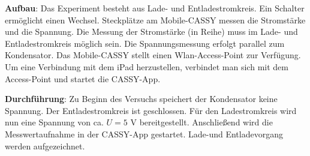 \documentclass[../main.tex]{subfiles}
\begin{document}
\begin{tcolorbox}
\begin{minipage}[c]{0.5\textwidth}
        \end{minipage}
    
    \vspace{0.4cm}
    \textbf{Aufbau}: Das Experiment besteht aus Lade- und Entladestromkreis. Ein Schalter ermöglicht einen Wechsel. Steckplätze am Mobile-CASSY messen die Stromstärke und die Spannung. Die Messung der Stromstärke (in Reihe) muss im Lade- und Entladestromkreis möglich sein. Die Spannungsmessung erfolgt parallel zum Kondensator. Das Mobile-CASSY stellt einen Wlan-Access-Point zur Verfügung. Um eine Verbindung mit dem iPad herzustellen, verbindet man sich mit dem Access-Point und startet die CASSY-App. 
    
    \vspace{0.4cm} 
    \begin{minipage}[]{0.75\textwidth}
        \textbf{Durchführung}: Zu Beginn des Versuchs speichert der Kondensator keine Spannung. Der Entladestromkreis ist geschlossen. Für den Ladestromkreis wird nun eine Spannung von ca. $U=5$ V bereitgestellt. Anschließend wird die Messwertaufnahme in der CASSY-App gestartet. Lade-und Entladevorgang werden aufgezeichnet. 


\end{minipage}
\end{tcolorbox}
\end{document}
